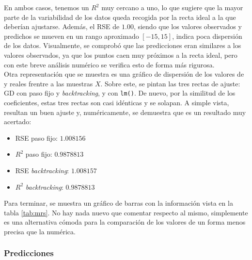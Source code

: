 \documentclass[11pt]{opticajnl}
\begin{document}
En ambos casos, tenemos un $R^2$ muy cercano a uno, lo que sugiere que la mayor parte de la variabilidad de los datos queda recogida por la recta ideal a la que deberían ajustarse. Además, el RSE de $1.00$, siendo que los valores observados y predichos se mueven en un rango aproximado $[-15, 15]$, indica poca dispersión de los datos. Visualmente, se comprobó que las predicciones eran similares a los valores observados, ya que los puntos caen muy próximos a la recta ideal, pero con este breve análisis numérico se verifica esto de forma más rigurosa. \\

Otra representación que se muestra es una gráfico de dispersión de los valores de y reales frentre a las muestras $X$. Sobre este, se pintan las tres rectas de ajuste: GD con paso fijo y \textit{backtracking}, y con \texttt{lm()}. De nuevo, por la similitud de los coeficientes, estas tres rectas son casi idénticas y se solapan. A simple vista, resultan un buen ajuste y, numéricamente, se demuestra que es un resultado muy acertado:
\begin{multicols}{2}
\begin{itemize}
\item RSE paso fijo: $1.008156$ 
\item $R^2$ paso fijo: $0.9878813$ 
\item RSE \textit{backtracking}: $1.008157$
\item $R^2$ \textit{backtracking}: $0.9878813$
\end{itemize}
\end{multicols}

Para terminar, se muestra un gráfico de barras con la información vista en la tabla \ref{tab:mrs}. No hay nada nuevo que comentar respecto al mismo, simplemente es una alternativa cómoda para la comparación de los valores de un forma menos precisa que la numérica. 

\subsubsection{Predicciones}
\end{document}
